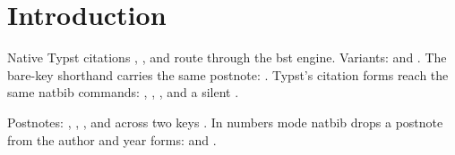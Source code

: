 \documentclass[acmsmall,nonacm]{acmart}
\begin{document}
\thispagestyle{empty}%

\section{Introduction}
Native Typst citations \cite{Cohen07}, \cite{Kosiur01}, and \cite{Harel78} route through the bst engine.
Variants: \citet{Harel78} \citealt{Harel78} \citeyearpar{Harel78}  and \cite[p.~5]{Harel78}.
The bare-key shorthand carries the same postnote: \cite[p.~5]{Harel78}.
Typst's citation forms reach the same natbib commands: \citet{Harel78}, \citeauthor{Harel78}, \citeyear{Harel78}, and a silent \nocite{Cohen07}.

Postnotes: \citet[p.~5]{Harel78}, \citealt[p.~5]{Harel78}, \citeyearpar[p.~5]{Harel78}, and across two keys \citet[p.~5]{Cohen07,Harel78}.
In numbers mode natbib drops a postnote from the author and year forms: \citeauthor[p.~5]{Harel78} and \citeyear[p.~5]{Harel78}.



\end{document}
